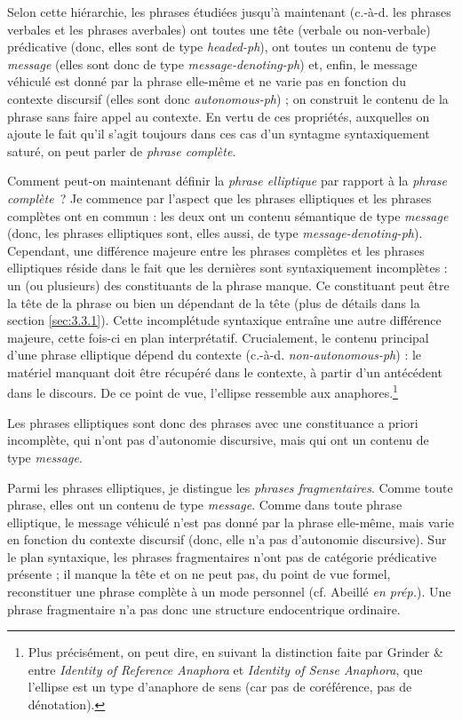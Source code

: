Selon cette hiérarchie, les phrases étudiées jusqu'à maintenant (c.-à-d. les phrases verbales et les phrases averbales) ont toutes une tête (verbale ou non-verbale) prédicative (donc, elles sont de type \textit{headed-ph}), ont toutes un contenu de type \textit{message} (elles sont donc de type \textit{message-denoting-ph}) et, enfin, le message véhiculé est donné par la phrase elle-même et ne varie pas en fonction du contexte discursif (elles sont donc \textit{autonomous-ph}) ; on construit le contenu de la phrase sans faire appel au contexte. En vertu de ces propriétés, auxquelles on ajoute le fait qu'il s'agit toujours dans ces cas d'un syntagme syntaxiquement saturé, on peut parler de \textit{phrase complète}.

Comment peut-on maintenant définir la \textit{phrase elliptique} par rapport à la \textit{phrase complète~}? Je commence par l'aspect que les phrases elliptiques et les phrases complètes ont en commun : les deux ont un contenu sémantique de type \textit{message} (donc, les phrases elliptiques sont, elles aussi, de type \textit{message-denoting-ph}). Cependant, une différence majeure entre les phrases complètes et les phrases elliptiques réside dans le fait que les dernières sont syntaxiquement incomplètes : un (ou plusieurs) des constituants de la phrase manque. Ce constituant peut être la tête de la phrase ou bien un dépendant de la tête (plus de détails dans la section \ref{sec:3.3.1}). Cette incomplétude syntaxique entraîne une autre différence majeure, cette fois-ci en plan interprétatif. Crucialement, le contenu principal d'une phrase elliptique dépend du contexte (c.-à-d. \textit{non-autonomous-ph}) : le matériel manquant doit être récupéré dans le contexte, à partir d'un antécédent dans le discours. De ce point de vue, l'ellipse ressemble aux anaphores.\footnote{Plus précisément, on peut dire, en suivant la distinction faite par Grinder \& \citet{Postal1971} entre \textit{Identity of Reference Anaphora} et \textit{Identity of Sense Anaphora}, que l'ellipse est un type d'anaphore de sens (car pas de coréférence, pas de dénotation).}

Les phrases elliptiques sont donc des phrases avec une constituance a priori incomplète, qui n'ont pas d'autonomie discursive, mais qui ont un contenu de type \textit{message}. 

Parmi les phrases elliptiques, je distingue les \textit{phrases fragmentaires}. Comme toute phrase, elles ont un contenu de type \textit{message}. Comme dans toute phrase elliptique, le message véhiculé n'est pas donné par la phrase elle-même, mais varie en fonction du contexte discursif (donc, elle n'a pas d'autonomie discursive). Sur le plan syntaxique, les phrases fragmentaires n'ont pas de catégorie prédicative présente ; il manque la tête et on ne peut pas, du point de vue formel, reconstituer une phrase complète à un mode personnel (cf. Abeillé \textit{en prép.}). Une phrase fragmentaire n'a pas donc une structure endocentrique ordinaire. 

